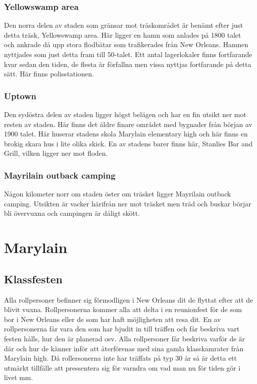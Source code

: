 \documentclass[a5paper,10pt]{report}
\begin{document}
\subsection{Yellowswamp area}
Den norra delen av staden som gränsar mot träskområdet är benämt efter just detta träsk, Yellowswamp area. Här ligger en hamn som anlades på 1800 talet och ankrade då upp stora flodbåtar som trafikerades från New Orleans. Hamnen nyttjades som just detta fram till 50-talet. Ett antal lagerlokaler finns fortfarande kvar sedan den tiden, de flesta är förfallna men vissa nyttjas fortfarande på detta sätt. Här finns polisstationen.
\subsection{Uptown}
Den sydöstra delen av staden ligger högst belägen och har en fin utsikt ner mot resten av staden. Här finns det äldre finare området med bygnader från början av 1900 talet. Här huserar stadens skola Marylain elementary high och här finns en brokig skara hus i lite olika skick. En av stadens barer finns här, Stanlies Bar and Grill, vilken ligger ner mot floden.
\subsection{Mayrilain outback camping}
Någon kilometer norr om staden öster om träsket ligger Mayrilain outback camping. Utsikten är vacker härifrån ner mot träsket men träd och buskar börjar bli övervuxna och campingen är dåligt skött.
\chapter{Marylain}

\section{Klassfesten}
Alla rollpersoner befinner sig förmodligen i New Orleans dit de flyttat efter att de blivit vuxna. Rollpersonerna kommer alla att delta i en reunionfest för de som bor i New Orleans eller de som har haft möjligheten att resa dit. En av rollpersonerna får vara den som har bjudit in till träffen och får beskriva vart festen hålls, hur den är planerad osv. Alla rollpersoner får beskriva varför de är där och hur de känner inför att återförenas med sina gamla klasskamrater från Marylain high. Då rollersonerna inte har träffats på typ 30 år så är detta ett utmärkt tillfälle att pressentera sig för varndra om vad man nu för tiden gör i livet mm.
\end{document}
